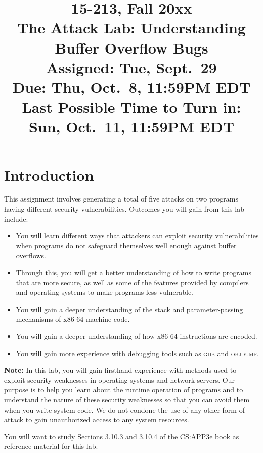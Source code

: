 \documentclass[11pt]{article}
\begin{document}
\title{15-213, Fall 20xx\\
The Attack Lab: Understanding Buffer Overflow Bugs\\
Assigned: Tue, Sept.~29\\
{\bf Due: Thu, Oct.~8, 11:59PM EDT}\\
Last Possible Time to Turn in: Sun, Oct.~11, 11:59PM EDT
}

\author{}
\date{}

\maketitle

\section{Introduction}

This assignment involves generating a total of five attacks on two
programs having different security vulnerabilities.
Outcomes you will gain from this lab include:
\begin{itemize}
\item You will learn different ways that attackers can exploit
  security vulnerabilities when programs do not safeguard themselves
  well enough against buffer overflows.
\item Through this, you will get a better understanding of how to write
  programs that are more secure, as well as some of the features
  provided by compilers and operating systems to make programs less
  vulnerable.
\item You will gain a deeper understanding of the stack and
  parameter-passing mechanisms of x86-64 machine code.
\item You will gain a deeper understanding of how x86-64 instructions
  are encoded.
\item You will gain more experience with debugging tools such as \textsc{gdb}
  and \textsc{objdump}.
\end{itemize}

{\bf Note:} In this lab, you will gain firsthand experience with
methods used to exploit security weaknesses in operating systems and
network servers.  Our purpose is to help you learn about the runtime
operation of programs and to understand the nature of these security
weaknesses so that you can avoid them when you write system code.  We do
not condone the use of any other form of attack to gain
unauthorized access to any system resources.

You will want to study Sections 3.10.3 and 3.10.4 of the CS:APP3e book
as reference material for this lab.
\end{document}
